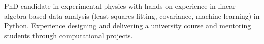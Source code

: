 \begin{cvparagraph}
PhD candidate in experimental physics with hands-on experience in linear algebra-based data analysis (least-squares fitting, covariance, machine learning) in Python. Experience designing and delivering a university course and mentoring students through computational projects.
\end{cvparagraph}

